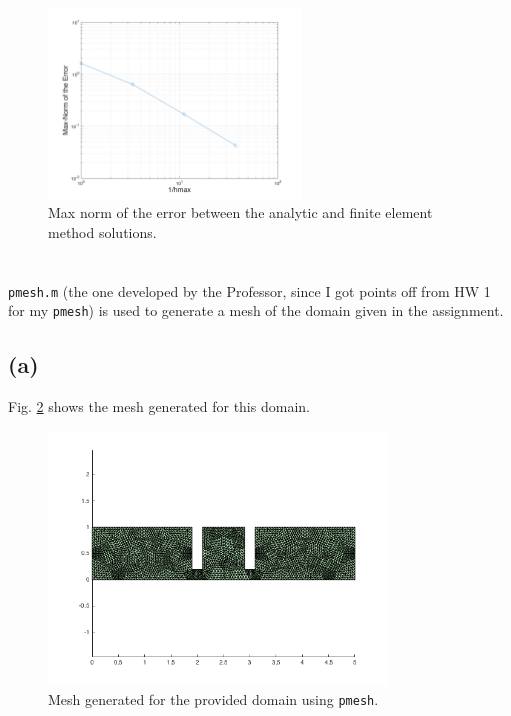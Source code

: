 \documentclass[10pt]{article}
\begin{document}
\begin{figure}[H]
\centering
\includegraphics[width=0.6\textwidth]{error.png}
\caption{Max norm of the error between the analytic and finite element method solutions.}
\label{fig:1}
\end{figure}





\section{} %

{\tt pmesh.m} (the one developed by the Professor, since I got points off from HW 1 for my {\tt pmesh}) is used to generate a mesh of the domain given in the assignment. 

\subsection{(a)}

Fig. \ref{fig:q3mesh} shows the mesh generated for this domain.

\begin{figure}[H]
\centering
\includegraphics[width=0.8\textwidth]{mesh_q3.png}
\caption{Mesh generated for the provided domain using {\tt pmesh}.}
\label{fig:q3mesh}
\end{figure}
\end{document}
